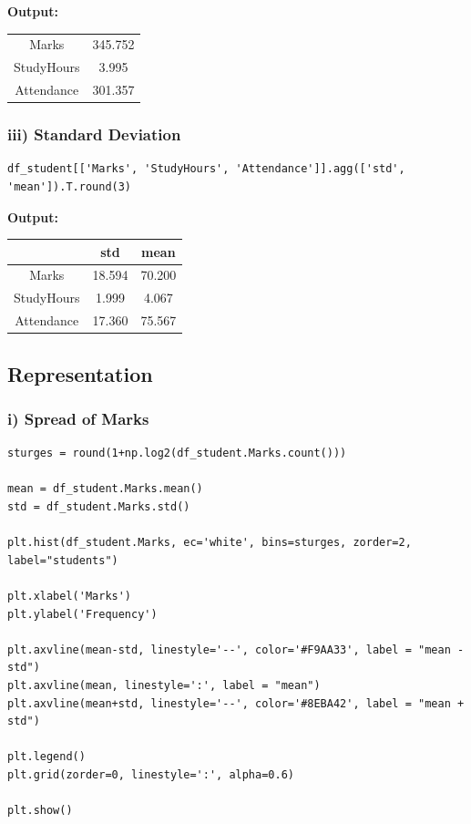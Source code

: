 \textbf{Output:}

\begin{tabular}{cc}
    \toprule
    Marks  & 345.752 \\
    StudyHours  & 3.995 \\
    Attendance  & 301.357 \\
    \bottomrule
\end{tabular}

\subsubsection*{iii) Standard Deviation}

\begin{lstlisting}[style=python]
df_student[['Marks', 'StudyHours', 'Attendance']].agg(['std', 'mean']).T.round(3)
\end{lstlisting}

\textbf{Output:}

\begin{tabular}{ccc}
    \toprule
    & \textbf{std} & \textbf{mean} \\
    \midrule
    Marks  & 18.594 & 70.200 \\
    StudyHours  & 1.999 & 4.067 \\
    Attendance  & 17.360 & 75.567 \\
    \bottomrule
\end{tabular}

\subsection{Representation}
\subsubsection*{i) Spread of Marks}

\begin{lstlisting}[style=python]
sturges = round(1+np.log2(df_student.Marks.count()))

mean = df_student.Marks.mean()
std = df_student.Marks.std()

plt.hist(df_student.Marks, ec='white', bins=sturges, zorder=2, label="students")

plt.xlabel('Marks')
plt.ylabel('Frequency')

plt.axvline(mean-std, linestyle='--', color='#F9AA33', label = "mean - std")
plt.axvline(mean, linestyle=':', label = "mean")
plt.axvline(mean+std, linestyle='--', color='#8EBA42', label = "mean + std")

plt.legend()
plt.grid(zorder=0, linestyle=':', alpha=0.6)

plt.show()

\end{lstlisting}

